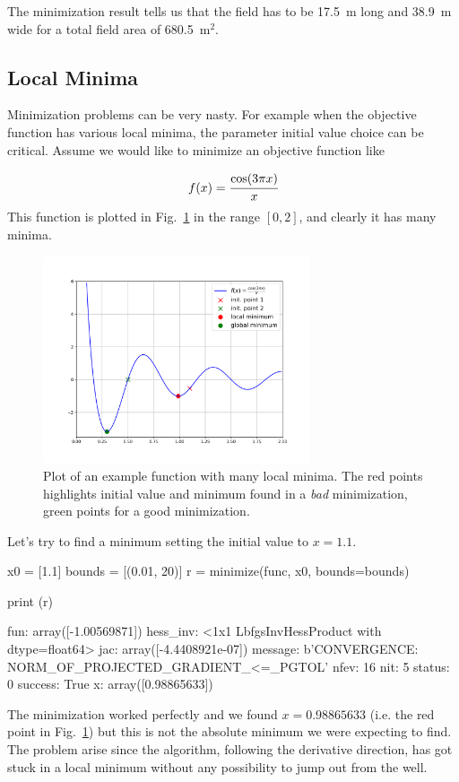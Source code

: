 The minimization result tells us that the field has to be 17.5~m long and 38.9~m wide for a total field area of 680.5~$\textrm{m}^2$.

\subsection{Local Minima}
Minimization problems can be very nasty.
For example when the objective function has various local minima, the parameter initial value choice can be critical. 
Assume we would like to minimize an objective function like 

\begin{equation*}
f(x) = \cfrac{\mathrm{cos}(3\pi x)}{x}
\end{equation*}
This function is plotted in Fig.~\ref{fig:local_minima} in the range $[0, 2]$, and clearly it has many minima. 

\begin{figure}[htb]
	\centering
	\includegraphics[width=0.7\textwidth]{figures/local_minima}
	\caption{Plot of an example function with many local minima. The red points highlights initial value and minimum found in a \emph{bad} minimization, green points for a good minimization.}
	\label{fig:local_minima}
\end{figure}
Let's try to find a minimum setting the initial value to $x=1.1$.
\begin{ipythonnon}
x0 = [1.1]
bounds = [(0.01, 20)]
r = minimize(func, x0, bounds=bounds)

print (r)
\end{ipythonnon}
\begin{ioutput}
     fun: array([-1.00569871])
hess_inv: <1x1 LbfgsInvHessProduct with dtype=float64>
     jac: array([-4.4408921e-07])
 message: b'CONVERGENCE: NORM_OF_PROJECTED_GRADIENT_<=_PGTOL'
    nfev: 16
     nit: 5
  status: 0
 success: True
       x: array([0.98865633])
\end{ioutput}
The minimization worked perfectly and we found $x=0.98865633$ (i.e. the red point in Fig.~\ref{fig:local_minima}) but this is not the absolute minimum we were expecting to find. The problem arise since the algorithm, following the derivative direction, has got stuck in a local minimum without any possibility to jump out from the well.

